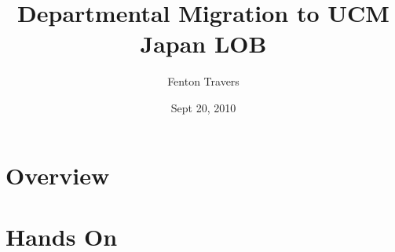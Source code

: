 \documentclass[final,letterpaper,12pt]{article}
\title{
  Departmental Migration to UCM\\
  Japan LOB}
\date{Sept 20, 2010}
\author{Fenton Travers}
\begin{document}
\setlength\fboxsep{1pt}
\setlength\fboxrule{0.5pt}
\maketitle
\newpage
\tableofcontents
\newpage
\listoffigures   
\newpage
\section{Overview} 
  
\clearpage

\clearpage

\clearpage
\section{Hands On}


  
\end{document}

